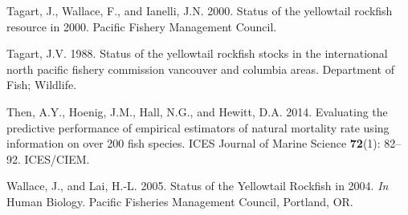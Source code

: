 \documentclass[12pt,]{article}
\begin{document}
\hypertarget{ref-Tagart2000}{}
Tagart, J., Wallace, F., and Ianelli, J.N. 2000. Status of the
yellowtail rockfish resource in 2000. Pacific Fishery Management
Council.

\hypertarget{ref-Tagart1988}{}
Tagart, J.V. 1988. Status of the yellowtail rockfish stocks in the
international north pacific fishery commission vancouver and columbia
areas. Department of Fish; Wildlife.

\hypertarget{ref-Then2014}{}
Then, A.Y., Hoenig, J.M., Hall, N.G., and Hewitt, D.A. 2014. Evaluating
the predictive performance of empirical estimators of natural mortality
rate using information on over 200 fish species. ICES Journal of Marine
Science \textbf{72}(1): 82--92. ICES/CIEM.

\hypertarget{ref-Wallace2005}{}
Wallace, J., and Lai, H.-L. 2005. Status of the Yellowtail Rockfish in
2004. \emph{In} Human Biology. Pacific Fisheries Management Council,
Portland, OR.
\end{document}
